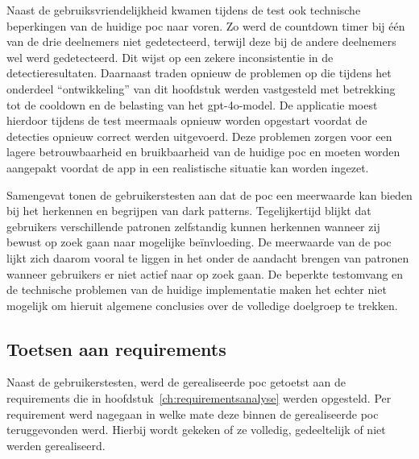 \vspace{1em}

Naast de gebruiksvriendelijkheid kwamen tijdens de test ook technische beperkingen van de huidige \acrshort{poc} naar voren. Zo werd de countdown timer bij één van de drie deelnemers niet gedetecteerd, terwijl deze bij de andere deelnemers wel werd gedetecteerd. Dit wijst op een zekere inconsistentie in de detectieresultaten. Daarnaast traden opnieuw de problemen op die tijdens het onderdeel ``ontwikkeling'' van dit hoofdstuk werden vastgesteld met betrekking tot de cooldown en de belasting van het \acrshort{gpt}-4o-model. De applicatie moest hierdoor tijdens de test meermaals opnieuw worden opgestart voordat de detecties opnieuw correct werden uitgevoerd. Deze problemen zorgen voor een lagere betrouwbaarheid en bruikbaarheid van de huidige \acrshort{poc} en moeten worden aangepakt voordat de app in een realistische situatie kan worden ingezet.

\vspace{1em}

Samengevat tonen de gebruikerstesten aan dat de \acrshort{poc} een meerwaarde kan bieden bij het herkennen en begrijpen van dark patterns. Tegelijkertijd blijkt dat gebruikers verschillende patronen zelfstandig kunnen herkennen wanneer zij bewust op zoek gaan naar mogelijke beïnvloeding. De meerwaarde van de \acrshort{poc} lijkt zich daarom vooral te liggen in het onder de aandacht brengen van patronen wanneer gebruikers er niet actief naar op zoek gaan. De beperkte testomvang en de technische problemen van de huidige implementatie maken het echter niet mogelijk om hieruit algemene conclusies over de volledige doelgroep te trekken.

\vspace{1em}

\subsection{Toetsen aan requirements}
\label{subsec:toetsen-requirements-evaluatie}

\vspace{1em}

Naast de gebruikerstesten, werd de gerealiseerde \acrshort{poc} getoetst aan de requirements die in hoofdstuk~\ref{ch:requirementsanalyse} werden opgesteld. Per requirement werd nagegaan in welke mate deze binnen de gerealiseerde \acrshort{poc} teruggevonden werd. Hierbij wordt gekeken of ze volledig, gedeeltelijk of niet werden gerealiseerd.

